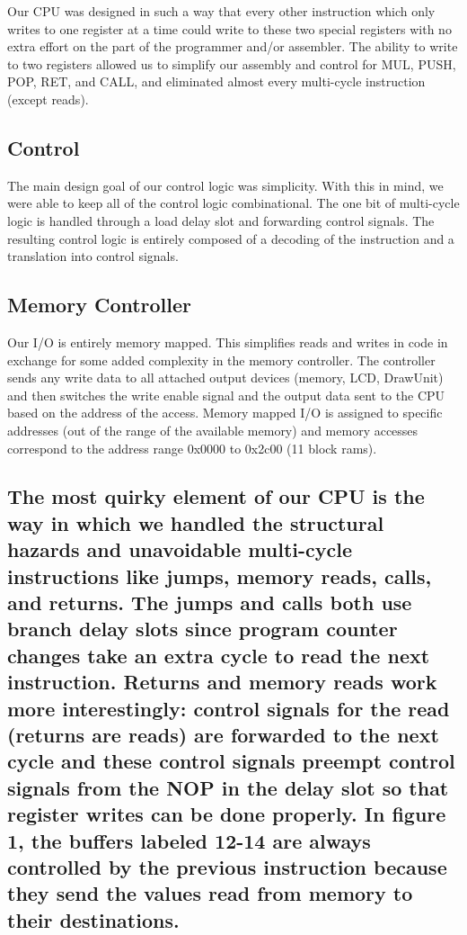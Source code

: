 \documentclass[onecolumn]{IEEEtran}
\begin{document}
Our CPU was designed in such a way that every other instruction which only writes to one register at a time could write to these two special registers with no extra effort on the part of the programmer and/or assembler. The ability to write to two registers allowed us to simplify our assembly and control for MUL, PUSH, POP, RET, and CALL, and eliminated almost every multi-cycle instruction (except reads).

\subsection{Control}
The main design goal of our control logic was simplicity.  With this in mind, we were able to keep all of the control logic combinational.  The one bit of multi-cycle logic is handled through a load delay slot and forwarding control signals.  The resulting control logic is entirely composed of a decoding of the instruction and a translation into control signals.

\subsection{Memory Controller}
Our I/O is entirely memory mapped.  This simplifies reads and writes in code in exchange for some added complexity in the memory controller.  The controller sends any write data to all attached output devices (memory, LCD, DrawUnit) and then switches the write enable signal and the output data sent to the CPU based on the address of the access.  Memory mapped I/O is assigned to specific addresses (out of the range of the available memory) and memory accesses correspond to the address range 0x0000 to 0x2c00 (11 block rams).

\subsection{The most quirky element of our CPU is the way in which we handled the structural hazards and unavoidable multi-cycle instructions like jumps, memory reads, calls, and returns.  The jumps and calls both use branch delay slots since program counter changes take an extra cycle to read the next instruction.  Returns and memory reads work more interestingly: control signals for the read (returns are reads) are forwarded to the next cycle and these control signals preempt control signals from the NOP in the delay slot so that register writes can be done properly. In figure 1, the buffers labeled 12-14 are always controlled by the previous instruction because they send the values read from memory to their destinations.  }
\end{document}
